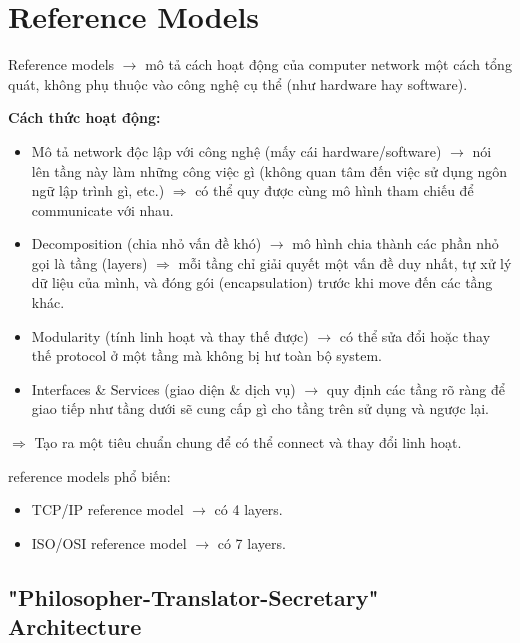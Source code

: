 \section{Reference Models}

\noindent
Reference models $\rightarrow$ mô tả cách hoạt động của computer network một cách tổng quát, không phụ thuộc vào công nghệ cụ thể (như hardware hay software).
\medskip


\noindent
\textbf{Cách thức hoạt động:}

\begin{itemize}
    \item Mô tả network độc lập với công nghệ (mấy cái hardware/software) $\rightarrow$ nói lên tầng này làm những công việc gì (không quan tâm đến việc sử dụng ngôn ngữ lập trình gì, etc.) $\Rightarrow$ có thể quy được cùng mô hình tham chiếu để communicate với nhau.
    \item Decomposition (chia nhỏ vấn đề khó) $\rightarrow$ mô hình chia thành các phần nhỏ gọi là tầng (layers) $\Rightarrow$ mỗi tầng chỉ giải quyết một vấn đề duy nhất, tự xử lý dữ liệu của mình, và đóng gói (encapsulation) trước khi move đến các tầng khác.
    \item Modularity (tính linh hoạt và thay thế được) $\rightarrow$ có thể sửa đổi hoặc thay thế protocol ở một tầng mà không bị hư toàn bộ system.
    \item Interfaces \& Services (giao diện \& dịch vụ) $\rightarrow$ quy định các tầng rõ ràng để giao tiếp như tầng dưới sẽ cung cấp gì cho tầng trên sử dụng và ngược lại.
\end{itemize}
\medskip

\noindent
$\Rightarrow$ Tạo ra một tiêu chuẩn chung để có thể connect và thay đổi linh hoạt.
\medskip

\vspace{0.2cm}

 reference models phổ biến:

\begin{itemize}
    \item TCP/IP reference model $\rightarrow$ có 4 layers.
    \item ISO/OSI reference model $\rightarrow$ có 7 layers.
\end{itemize}
\medskip

\subsection{"Philosopher-Translator-Secretary" Architecture}

